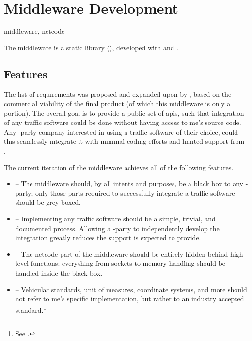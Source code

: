 \chapter{Middleware Development}\label{ch:middleware}

\begin{keywords}
	middleware, netcode
\end{keywords}

The \gls{middleware} is a  static library (), developed with  and .

\section{Features}\label{sc:middleware:features}

The list of requirements was proposed and expanded upon by , based on the commercial viability of the final product (of which this \gls{middleware} is only a portion). The overall goal is to provide a public set of \glspl{api}, such that integration of any traffic software could be done without having access to \gls{me}'s source code. Any -party company interested in using a traffic software of their choice, could this seamlessly integrate it with minimal coding efforts and limited support from .

The current iteration of the \gls{middleware} achieves all of the following \glspl{feature}.

\begin{itemize}
	\item {} -- The \gls{middleware} should, by all intents and purposes, be a black box to any -party; only those parts required to successfully integrate a traffic software should be grey boxed.
	\item {} -- Implementing any traffic software should be a simple, trivial, and documented process. Allowing a -party to independently develop the integration greatly reduces the support  is expected to provide.
	\item {} -- The \gls{netcode} part of the \gls{middleware} should be entirely hidden behind high-level functions: everything from sockets to memory handling should be handled inside the black box.
	\item {} -- Vehicular standards, unit of measures, coordinate systems, and more should not refer to \gls{me}'s specific implementation, but rather to an industry accepted standard.\footnote{See .}
\end{itemize}

